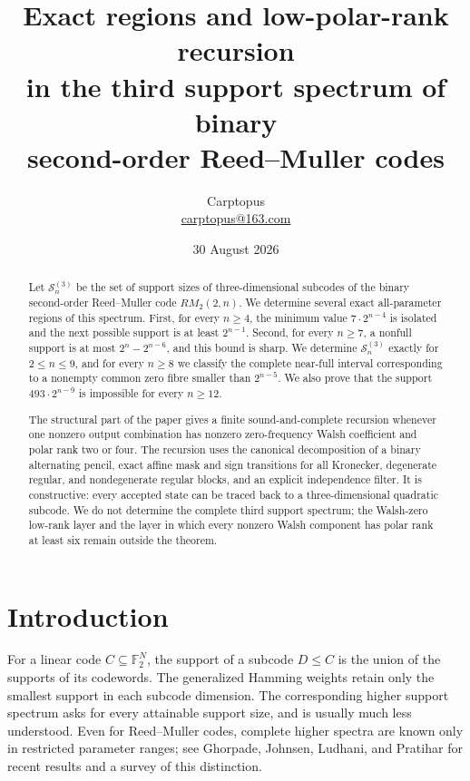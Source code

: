 \documentclass[11pt]{article}
\title{Exact regions and low-polar-rank recursion\\
in the third support spectrum of binary\\
second-order Reed--Muller codes}
\author{Carptopus\\\href{mailto:carptopus@163.com}{carptopus@163.com}}
\date{30 August 2026}
\theoremstyle{remark}
\numberwithin{equation}{section}
\begin{document}
\maketitle

\begin{center}
\end{center}

\begin{abstract}


Let \(\mathcal S_n^{(3)}\) be the set of support sizes of three-dimensional
subcodes of the binary second-order Reed--Muller code \(RM_2(2,n)\). We determine
several exact all-parameter regions of this spectrum. First, for every \(n\ge4\),
the minimum value \(7\cdot2^{n-4}\) is isolated and the next possible support is
at least \(2^{n-1}\). Second, for every \(n\ge7\), a nonfull support is at most
\(2^n-2^{n-6}\), and this bound is sharp. We determine \(\mathcal S_n^{(3)}\)
exactly for \(2\le n\le9\), and for every \(n\ge8\) we classify the complete
near-full interval corresponding to a nonempty common zero fibre smaller than
\(2^{n-5}\). We also prove that the support
\(493\cdot2^{n-9}\) is impossible for every \(n\ge12\).

The structural part of the paper gives a finite sound-and-complete recursion
whenever one nonzero output combination has nonzero zero-frequency Walsh
coefficient and polar rank two or four. The recursion uses the canonical
decomposition of a binary alternating pencil, exact affine mask and sign
transitions for all Kronecker, degenerate regular, and nondegenerate regular
blocks, and an explicit independence filter. It is constructive: every accepted
state can be traced back to a three-dimensional quadratic subcode. We do not
determine the complete third support spectrum; the Walsh-zero low-rank layer and
the layer in which every nonzero Walsh component has polar rank at least six
remain outside the theorem.

\end{abstract}

\section{Introduction}


For a linear code \(C\subseteq\mathbb F_2^N\), the support of a subcode
\(D\le C\) is the union of the supports of its codewords. The generalized
Hamming weights retain only the smallest support in each subcode dimension.
The corresponding higher support spectrum asks for every attainable support
size, and is usually much less understood. Even for Reed--Muller codes, complete
higher spectra are known only in restricted parameter ranges; see Ghorpade,
Johnsen, Ludhani, and Pratihar \cite{ghorpade2026} for recent results and a survey of this
distinction.
\end{document}
